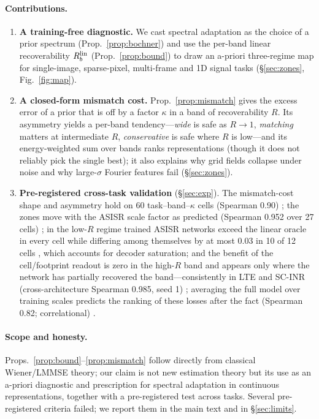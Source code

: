 \paragraph{Contributions.}
\begin{enumerate}
\item \textbf{A training-free diagnostic.} We cast spectral adaptation as the
choice of a prior spectrum (Prop.~\ref{prop:bochner}) and use the per-band
linear recoverability $R_b^{\mathrm{lin}}$ (Prop.~\ref{prop:bound}) to draw an a-priori
three-regime map for single-image, sparse-pixel, multi-frame and 1D signal
tasks (\S\ref{sec:zones}, Fig.~\ref{fig:map}).
\item \textbf{A closed-form mismatch cost.} Prop.~\ref{prop:mismatch} gives
the excess error of a prior that is off by a factor $\kappa$ in a band of
recoverability $R$. Its asymmetry yields a per-band tendency---\emph{wide} is safe as $R\to1$,
\emph{matching} matters at intermediate $R$, \emph{conservative} is safe where
$R$ is low---and its energy-weighted sum over bands ranks representations
(though it does not reliably pick the single best); it also explains why grid fields collapse under noise and
why large-$\sigma$ Fourier features fail (\S\ref{sec:zones}).
\item \textbf{Pre-registered cross-task validation} (\S\ref{sec:exp}).
The mismatch-cost shape and asymmetry hold on 60 task--band--$\kappa$ cells
(Spearman 0.90) ; the zones move with the ASISR scale factor as
predicted (Spearman 0.952 over 27 cells) ; in the low-$R$
regime trained ASISR networks exceed the linear oracle in every cell while
differing among themselves by at most 0.03 in 10 of 12 cells ,
which accounts for decoder saturation; and the benefit of the cell/footprint
readout is zero in the high-$R$ band and appears only where the network has
partially recovered the band---consistently in LTE and SC-INR
(cross-architecture Spearman 0.985, seed 1) ; averaging the full model
over training scales predicts the ranking of these losses after the fact
(Spearman 0.82; correlational) .
\end{enumerate}

\paragraph{Scope and honesty.} Props.~\ref{prop:bound}--\ref{prop:mismatch}
follow directly from classical Wiener/LMMSE theory; our claim is not new
estimation theory but its use as an a-priori diagnostic and prescription for
spectral adaptation in continuous representations, together with a
pre-registered test across tasks. Several pre-registered criteria failed; we
report them in the main text and in \S\ref{sec:limits}.
